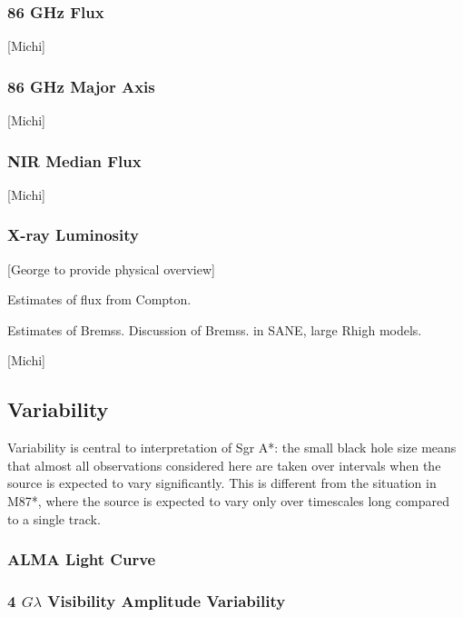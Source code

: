 \subsubsection{86 GHz Flux}

[Michi]

\subsubsection{86 GHz Major Axis}

[Michi]

\subsubsection{NIR Median Flux}

[Michi]

\subsubsection{X-ray Luminosity}

[George to provide physical overview]

Estimates of flux from Compton.

Estimates of Bremss.  Discussion of Bremss. in SANE, large Rhigh models.

[Michi]

\subsection{Variability}

Variability is central to interpretation of Sgr A*: the small black hole size means that almost all observations considered here are taken over intervals when the source is expected to vary significantly.  This is different from the situation in M87*, where the source is expected to vary only over timescales long compared to a single track.

\subsubsection{ALMA Light Curve}

\subsubsection{4 $G\lambda$ Visibility Amplitude Variability}

